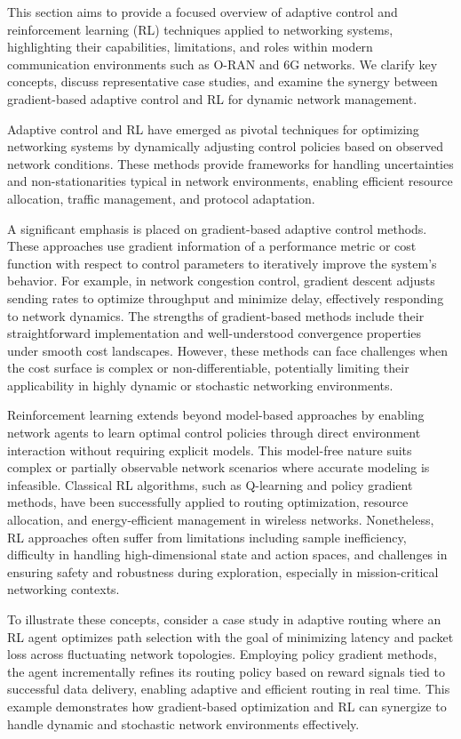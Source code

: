 \documentclass[sigconf]{acmart}
\begin{document}
This section aims to provide a focused overview of adaptive control and reinforcement learning (RL) techniques applied to networking systems, highlighting their capabilities, limitations, and roles within modern communication environments such as O-RAN and 6G networks. We clarify key concepts, discuss representative case studies, and examine the synergy between gradient-based adaptive control and RL for dynamic network management.

Adaptive control and RL have emerged as pivotal techniques for optimizing networking systems by dynamically adjusting control policies based on observed network conditions. These methods provide frameworks for handling uncertainties and non-stationarities typical in network environments, enabling efficient resource allocation, traffic management, and protocol adaptation.

A significant emphasis is placed on gradient-based adaptive control methods. These approaches use gradient information of a performance metric or cost function with respect to control parameters to iteratively improve the system's behavior. For example, in network congestion control, gradient descent adjusts sending rates to optimize throughput and minimize delay, effectively responding to network dynamics. The strengths of gradient-based methods include their straightforward implementation and well-understood convergence properties under smooth cost landscapes. However, these methods can face challenges when the cost surface is complex or non-differentiable, potentially limiting their applicability in highly dynamic or stochastic networking environments.

Reinforcement learning extends beyond model-based approaches by enabling network agents to learn optimal control policies through direct environment interaction without requiring explicit models. This model-free nature suits complex or partially observable network scenarios where accurate modeling is infeasible. Classical RL algorithms, such as Q-learning and policy gradient methods, have been successfully applied to routing optimization, resource allocation, and energy-efficient management in wireless networks. Nonetheless, RL approaches often suffer from limitations including sample inefficiency, difficulty in handling high-dimensional state and action spaces, and challenges in ensuring safety and robustness during exploration, especially in mission-critical networking contexts.

To illustrate these concepts, consider a case study in adaptive routing where an RL agent optimizes path selection with the goal of minimizing latency and packet loss across fluctuating network topologies. Employing policy gradient methods, the agent incrementally refines its routing policy based on reward signals tied to successful data delivery, enabling adaptive and efficient routing in real time. This example demonstrates how gradient-based optimization and RL can synergize to handle dynamic and stochastic network environments effectively.
\end{document}
